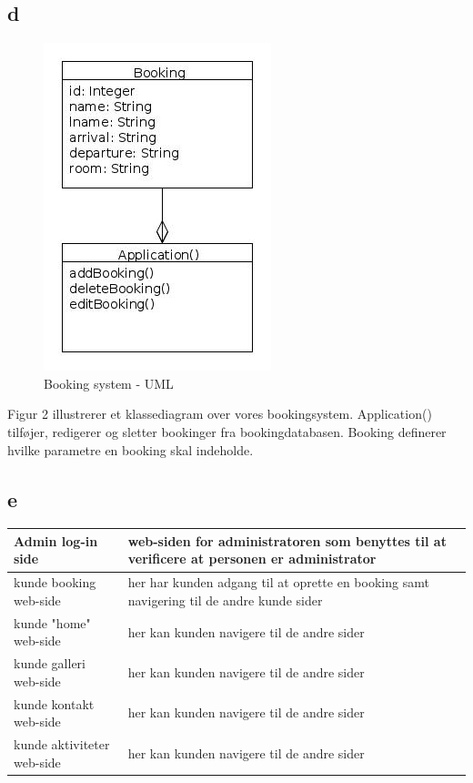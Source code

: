 \documentclass[12pt,a4paper]{article}
\begin{document}
\subsection{d}
\begin{figure}[H]
\centering
\includegraphics[scale=0.6]{BookingSystem.jpg}
\caption{Booking system - UML}
\end{figure}
Figur 2 illustrerer et klassediagram over vores bookingsystem. Application() tilføjer, redigerer og sletter bookinger fra bookingdatabasen. Booking definerer hvilke parametre en booking skal indeholde.
\subsection{e}

\begin{minipage}{\textwidth}

 \label{tab:title}
\begin{tabular}{| p{5cm} | p{10cm} |}
\hline Admin log-in side & web-siden for administratoren som benyttes til at verificere at personen er administrator \\
\hline kunde booking web-side & her har kunden adgang til at oprette en booking samt navigering til de andre kunde sider \\
\hline kunde "home" web-side & her kan kunden navigere til de andre sider \\
\hline kunde galleri web-side & her kan kunden navigere til de andre sider \\
\hline kunde kontakt web-side & her kan kunden navigere til de andre sider \\
\hline kunde aktiviteter web-side & her kan kunden navigere til de andre sider \\
\hline
\end{tabular}

\end{minipage}
\end{document}
